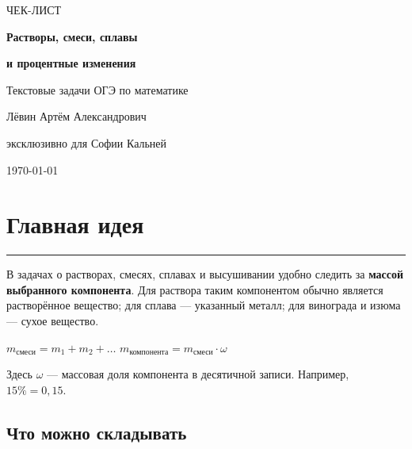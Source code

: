 \documentclass[a4paper,12pt]{article}
\newcommand{\sectionline}{%
  \par\vspace{2pt}
  {\color{accent}\rule{\linewidth}{0.7pt}}
  \vspace{4pt}
}
\newcommand{\key}[1]{\textcolor{darkaccent}{\textbf{#1}}}
\newcommand{\formula}[1]{%
  \begin{center}
    \begin{minipage}{0.9\linewidth}
      \centering\large\color{darkaccent}#1
    \end{minipage}
  \end{center}
}
\begin{document}
\begin{titlepage}
  \centering
  \vspace*{24mm}
  {\color{accent}\Large ЧЕК-ЛИСТ\par}
  \vspace{8mm}
  {\Huge\bfseries Растворы, смеси, сплавы\par}
  \vspace{3mm}
  {\Huge\bfseries и процентные изменения\par}
  \vspace{10mm}
  {\Large Текстовые задачи ОГЭ по математике\par}

  \vfill
  {\large Лёвин Артём Александрович\par}
  \vspace{2mm}
  {\large эксклюзивно для Софии Кальней\par}
  \vspace{8mm}
  {\large \today\par}

  \vfill
  \vspace*{8mm}
\end{titlepage}

\tableofcontents
\newpage

\section{Главная идея}
\sectionline

В задачах о растворах, смесях, сплавах и высушивании удобно следить за
\key{массой выбранного компонента}. Для раствора таким компонентом обычно
является растворённое вещество; для сплава --- указанный металл; для
винограда и изюма --- сухое вещество.

\formula{
  $m_{\text{смеси}}=m_1+m_2+\dots$
  \qquad
  $m_{\text{компонента}}=m_{\text{смеси}}\cdot\omega$
}

Здесь $\omega$ --- массовая доля компонента в десятичной записи. Например,
$15\%=0{,}15$.

\subsection{Что можно складывать}
\end{document}
